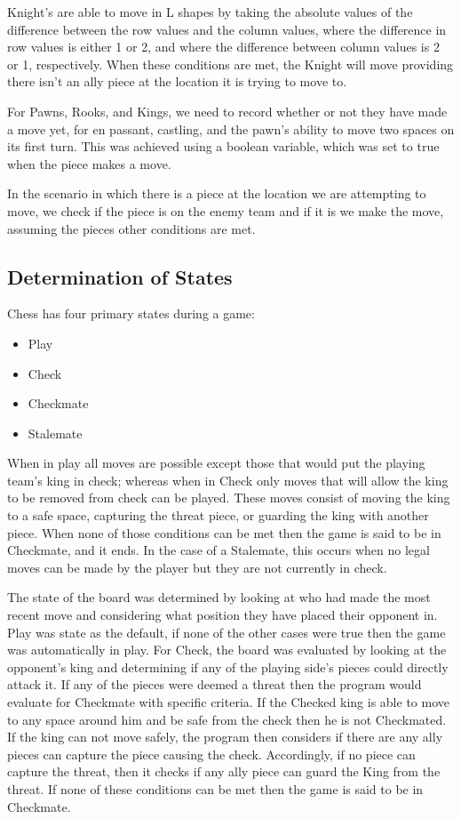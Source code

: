 \documentclass[conference]{IEEEtran}
\begin{document}
Knight's are able to move in L shapes by taking the absolute values of the difference between the row values and the column values, where the difference in row values is either 1 or 2, and where the difference between column values is 2 or 1, respectively. When these conditions are met, the Knight will move providing there isn't an ally piece at the location it is trying to move to.

For Pawns, Rooks, and Kings, we need to record whether or not they have made a move yet, for en passant, castling, and the pawn's ability to move two spaces on its first turn. This was achieved using a boolean variable, which was set to true when the piece makes a move. 

In the scenario in which there is a piece at the location we are attempting to move, we check if the piece is on the enemy team and if it is we make the move, assuming the pieces other conditions are met.

\subsection{Determination of States}
Chess has four primary states during a game: 
\begin{itemize}
	\item Play
	\item Check
	\item Checkmate
	\item Stalemate
\end{itemize}

When in play all moves are possible except those that would put the playing team's king in check; whereas when in Check only moves that will allow the king to be removed from check can be played. These moves consist of moving the king to a safe space, capturing the threat piece, or guarding the king with another piece. When none of those conditions can be met then the game is said to be in Checkmate, and it ends. In the case of a Stalemate, this occurs when no legal moves can be made by the player but they are not currently in check.

The state of the board was determined by looking at who had made the most recent move and considering what position they have placed their opponent in. Play was state as the default, if none of the other cases were true then the game was automatically in play. For Check, the board was evaluated by looking at the opponent's king and determining if any of the playing side's pieces could directly attack it. If any of the pieces were deemed a threat then the program would evaluate for Checkmate with specific criteria. If the Checked king is able to move to any space around him and be safe from the check then he is not Checkmated. If the king can not move safely, the program then considers if there are any ally pieces can capture the piece causing the check. Accordingly, if no piece can capture the threat, then it checks if any ally piece can guard the King from the threat. If none of these conditions can be met then the game is said to be in Checkmate.
\end{document}
